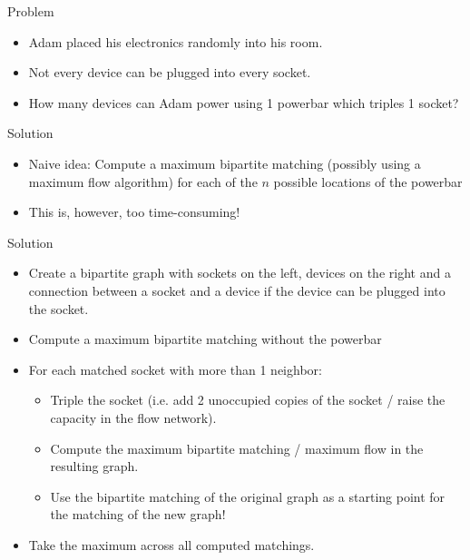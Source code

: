 \begin{slide}
    \begin{block}{Problem}
		\begin{itemize}
			\item Adam placed his electronics randomly into his room.
			\item Not every device can be plugged into every socket.
			\item How many devices can Adam power using 1 powerbar which triples 1 socket?
		\end{itemize}
    \end{block}
    \begin{block}{Solution}
		\begin{itemize}
			\item Naive idea: Compute a maximum bipartite matching (possibly using a maximum flow algorithm) for each of the $n$ possible locations of the powerbar
			\item This is, however, too time-consuming!
		\end{itemize}
    \end{block}
\end{slide}

\begin{slide}
    \begin{block}{Solution}
		\begin{itemize}
			\item Create a bipartite graph with sockets on the left, devices on the right and a connection between a socket and a device if the device can be plugged into the socket.
			\item Compute a maximum bipartite matching without the powerbar
			\item For each matched socket with more than 1 neighbor:
			\begin{itemize}
				\item Triple the socket (i.e. add 2 unoccupied copies of the socket / raise the capacity in the flow network).
				\item Compute the maximum bipartite matching / maximum flow in the resulting graph.
				\item Use the bipartite matching of the original graph as a starting point for the matching of the new graph!
			\end{itemize}
			\item Take the maximum across all computed matchings.
		\end{itemize}
    \end{block}
\end{slide}

